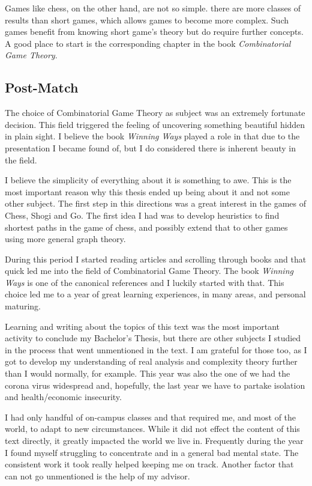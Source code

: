 Games like chess, on the other hand, are not so simple. there are more classes of results than short games, which allows games to become more complex. Such games benefit from knowing short game's theory but do require further concepts. A good place to start is the corresponding chapter in the book \textit{Combinatorial Game Theory}.


\subsection*{Post-Match}

The choice of Combinatorial Game Theory as subject was an extremely fortunate decision. This field triggered the feeling of uncovering something beautiful hidden in plain sight. I believe the book \textit{Winning Ways} played a role in that due to the presentation I became found of, but I do considered there is inherent beauty in the field.

I believe the simplicity of everything about it is something to awe. This is the most important reason why this thesis ended up being about it and not some other subject. The first step in this directions was a great interest in the games of Chess, Shogi and Go. The first idea I had was to develop heuristics to find shortest paths in the game of chess, and possibly extend that to other games using more general graph theory.

During this period I started reading articles and scrolling through books and that quick led me into the field of Combinatorial Game Theory. The book \textit{Winning Ways} is one of the canonical references and I luckily started with that. This choice led me to a year of great learning experiences, in many areas, and personal maturing.

Learning and writing about the topics of this text was the most important activity to conclude my Bachelor's Thesis, but there are other subjects I studied in the process that went unmentioned in the text. I am grateful for those too, as I got to develop my understanding of real analysis and complexity theory further than I would normally, for example. This year was also the one of we had the corona virus widespread and, hopefully, the last year we have to partake isolation and health/economic insecurity.

I had only handful of on-campus classes and that required me, and most of the world, to adapt to new circumstances. While it did not effect the content of this text directly, it greatly impacted the world we live in. Frequently during the year I found myself struggling to concentrate and in a general bad mental state. The consistent work it took really helped keeping me on track. Another factor that can not go unmentioned is the help of my advisor.

